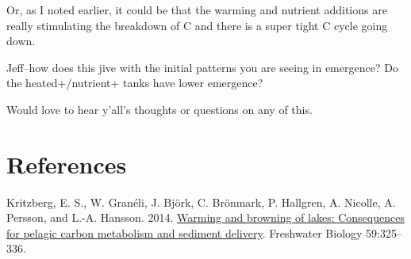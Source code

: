 \documentclass[
]{article}
\newlength{\cslhangindent}
\newlength{\cslentryspacingunit} %
\newenvironment{CSLReferences}[2] %
 {%
  \setlength{\parindent}{0pt}
  \ifodd #1
  \let\oldpar\par
  \def\par{\hangindent=\cslhangindent\oldpar}
  \fi
  \setlength{\parskip}{#2\cslentryspacingunit}
 }%
 {}
\begin{document}
Or, as I noted earlier, it could be that the warming and nutrient
additions are really stimulating the breakdown of C and there is a super
tight C cycle going down.

Jeff--how does this jive with the initial patterns you are seeing in
emergence? Do the heated+/nutrient+ tanks have lower emergence?

Would love to hear y'all's thoughts or questions on any of this.

\hypertarget{references}{%
\section*{References}\label{references}}

\hypertarget{refs}{}
\begin{CSLReferences}{1}{0}
\leavevmode{}%
Kritzberg, E. S., W. Granéli, J. Björk, C. Brönmark, P. Hallgren, A.
Nicolle, A. Persson, and L.-A. Hansson. 2014.
\href{https://doi.org/10.1111/fwb.12267}{Warming and browning of lakes:
Consequences for pelagic carbon metabolism and sediment delivery}.
Freshwater Biology 59:325--336.

\end{CSLReferences}
\end{document}
